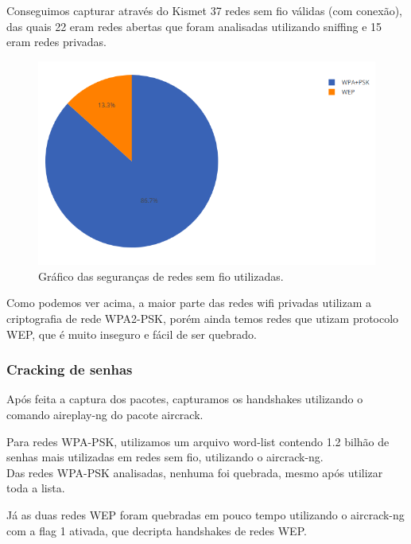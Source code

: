 \documentclass[
	article,			%
	12pt,				%
	oneside,			%
	a4paper,			%
	english,			%
	brazil,				%
	sumario=tradicional
	]{abntex2}
\begin{document}
Conseguimos capturar através do Kismet 37 redes sem fio válidas (com conexão), das quais 22 eram redes abertas que foram analisadas utilizando sniffing e 15 eram redes privadas.

\begin{figure}[H]
	\centering
	\caption{Gráfico das seguranças de redes sem fio utilizadas.}
	\includegraphics[scale=0.7]{graficopie-seguranca-redes}
\end{figure}

Como podemos ver acima, a maior parte das redes wifi privadas utilizam a criptografia de rede WPA2-PSK, porém ainda temos redes que utizam protocolo WEP, que é muito inseguro e fácil de ser quebrado.

\subsubsection{Cracking de senhas}

Após feita a captura dos pacotes, capturamos os handshakes utilizando o comando aireplay-ng do pacote aircrack.\\


Para redes WPA-PSK, utilizamos um arquivo word-list contendo 1.2 bilhão de senhas mais utilizadas em redes sem fio, utilizando o aircrack-ng.\\

Das redes WPA-PSK analisadas, nenhuma foi quebrada, mesmo após utilizar toda a lista.\\


Já as duas redes WEP foram quebradas em pouco tempo utilizando o aircrack-ng com a flag 1 ativada, que decripta handshakes de redes WEP.
\end{document}
